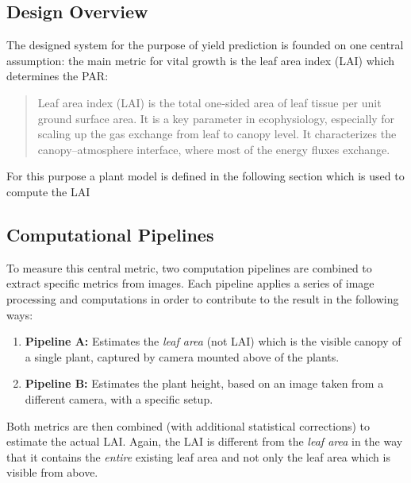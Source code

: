 \graphicspath{{members/ssr/figures/modelling}}

\subsection{Design Overview}


The designed system for the purpose of yield prediction is founded on one central assumption: 
the main metric for vital growth is the leaf area index (LAI) which determines the PAR:

\begin{quote}
    \centering
    Leaf area index (LAI) is the total one‐sided area of leaf tissue per unit ground surface area.
    It is a key parameter in ecophysiology, especially for scaling up the gas exchange from leaf
    to canopy level.
    It characterizes the canopy–atmosphere interface, where most of the energy fluxes exchange. \cite{beda:nathalie}
\end{quote}

For this purpose a plant model is defined in the following section which is used to compute the LAI



\subsection{Computational Pipelines}


To measure this central metric, two computation pipelines are combined to extract specific metrics from images.
Each pipeline applies a series of image processing and computations in order to contribute to the result
in the following ways:

\begin{enumerate}
    \item \textbf{Pipeline A:} Estimates the \textit{leaf area} (not LAI) which is the visible canopy
    of a single plant, captured by camera mounted above of the plants.
    \item \textbf{Pipeline B:} Estimates the plant height, based on an image taken from a different camera,
    with a specific setup.
\end{enumerate}

Both metrics are then combined (with additional statistical corrections) to estimate the actual LAI.
Again, the LAI is different from the \textit{leaf area} in the way that it contains
the \textit{entire} existing leaf area and not only the leaf area which is visible from above.

